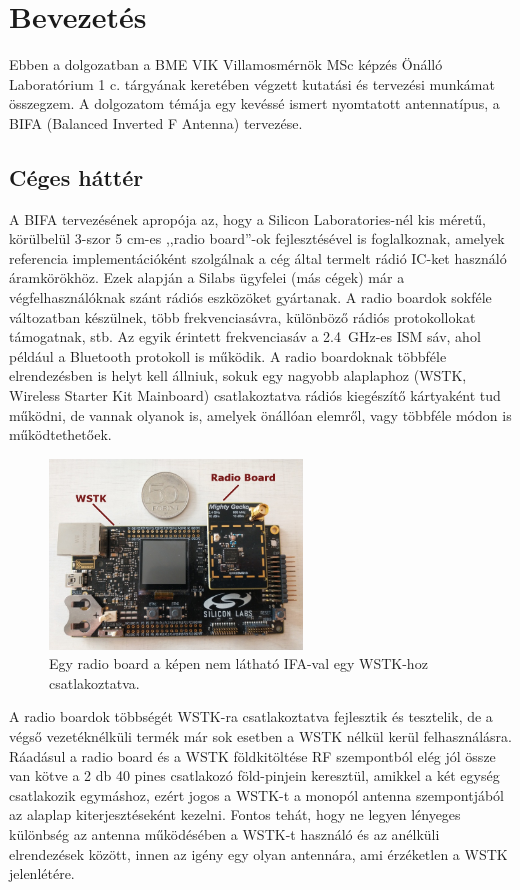 \chapter{Bevezetés}
Ebben a dolgozatban a BME VIK Villamosmérnök MSc képzés Önálló Laboratórium 1 c. tárgyának keretében végzett kutatási és tervezési munkámat összegzem. A dolgozatom témája egy kevéssé ismert nyomtatott antennatípus, a BIFA (Balanced Inverted F Antenna) tervezése.
\section{Céges háttér}
A BIFA tervezésének apropója az, hogy a Silicon Laboratories-nél kis méretű, körülbelül 3-szor 5 cm-es ,,radio board''-ok fejlesztésével is foglalkoznak, amelyek referencia implementációként szolgálnak a cég által termelt rádió IC-ket használó áramkörökhöz. Ezek alapján a Silabs ügyfelei (más cégek) már a végfelhasználóknak szánt rádiós eszközöket gyártanak. A radio boardok sokféle változatban készülnek, több frekvenciasávra, különböző rádiós protokollokat támogatnak, stb. Az egyik érintett frekvenciasáv a \SI{2,4}{GHz}-es ISM sáv, ahol például a Bluetooth protokoll is működik. A radio boardoknak többféle elrendezésben is helyt kell állniuk, sokuk egy nagyobb alaplaphoz (WSTK, Wireless Starter Kit Mainboard) csatlakoztatva rádiós kiegészítő kártyaként tud működni, de vannak olyanok is, amelyek önállóan elemről, vagy többféle módon is működtethetőek.
\begin{figure}[h]
	\centering
	\includegraphics[width=0.6\textwidth]{kep/wstk-rb.jpg}
	\caption{Egy radio board a képen nem látható IFA-val egy WSTK-hoz csatlakoztatva.}
	\label{fig:wstk-rb}
\end{figure}
\par A radio boardok többségét WSTK-ra csatlakoztatva fejlesztik és tesztelik, de a végső vezetéknélküli termék már sok esetben a WSTK nélkül kerül felhasználásra. Ráadásul a radio board és a WSTK földkitöltése RF szempontból elég jól össze van kötve a 2 db 40 pines csatlakozó föld-pinjein keresztül, amikkel a két egység csatlakozik egymáshoz, ezért jogos a WSTK-t a monopól antenna szempontjából az alaplap kiterjesztéseként kezelni. Fontos tehát, hogy ne legyen lényeges különbség az antenna működésében a WSTK-t használó és az anélküli elrendezések között, innen az igény egy olyan antennára, ami érzéketlen a WSTK jelenlétére.
